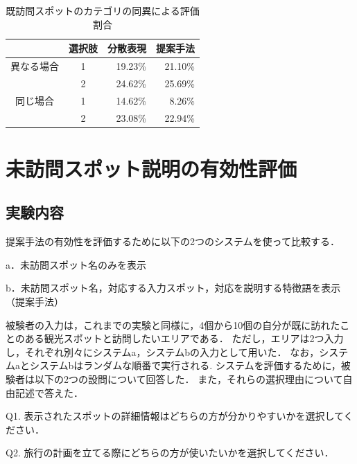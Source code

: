 \documentclass[submit]{ipsj}
\begin{document}
\begin{table}[t]
  \caption{既訪問スポットのカテゴリの同異による評価割合}
  \label{table:既訪問スポットのカテゴリの同異による評価割合}
  \centering
  \begin{tabular}{c|c|r|r}
  \hline  \hline
  & 選択肢 & \multicolumn{1}{c|}{分散表現} & \multicolumn{1}{c}{提案手法} \\ \hline
  異なる場合                 & 1   & 19.23\%                  & 21.10\%                 \\ \cline{2-4}
  & 2   & 24.62\%                  & 25.69\%                 \\ \hline
  同じ場合                  & 1   & 14.62\%                  & 8.26\%                  \\ \cline{2-4}
  \multicolumn{1}{l|}{} & 2   & 23.08\%                  & 22.94\%                 \\ \hline
  \end{tabular}
\end{table}

\section{未訪問スポット説明の有効性評価}
\label{sec:未訪問スポット説明の有効性評価}
\subsection{実験内容}
提案手法の有効性を評価するために以下の2つのシステムを使って比較する．
\begin{description}
  \item a．未訪問スポット名のみを表示
  \item b．未訪問スポット名，対応する入力スポット，対応を説明する特徴語を表示（提案手法）
\end{description}

被験者の入力は，これまでの実験と同様に，4個から10個の自分が既に訪れたことのある観光スポットと訪問したいエリアである．
ただし，エリアは2つ入力し，それぞれ別々にシステムa，システムbの入力として用いた．
なお，システムaとシステムbはランダムな順番で実行される.
システムを評価するために，被験者は以下の2つの設問について回答した．
また，それらの選択理由について自由記述で答えた．
\begin{description}
  \item Q1. 表示されたスポットの詳細情報はどちらの方が分かりやすいかを選択してください．
  \item Q2. 旅行の計画を立てる際にどちらの方が使いたいかを選択してください．
\end{description}
\end{document}
